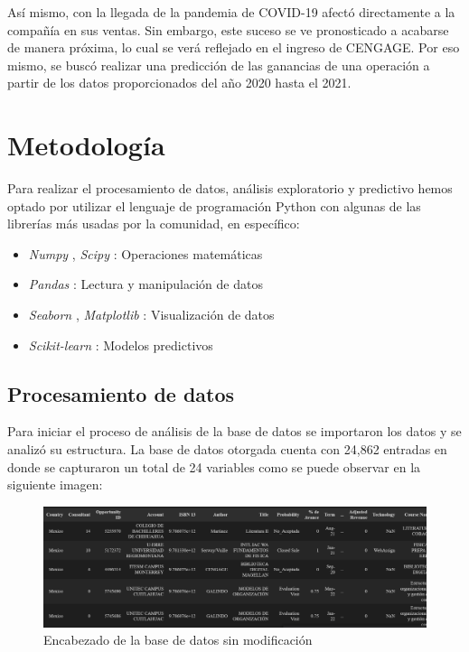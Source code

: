\documentclass{article}
\begin{document}
        Así mismo, con la llegada de la pandemia de COVID-19 afectó directamente a la compañía en sus ventas. Sin embargo, este suceso se ve pronosticado a acabarse de manera próxima, lo cual se verá reflejado en el ingreso de CENGAGE. Por eso mismo, se buscó realizar una predicción de las ganancias de una operación a partir de los datos proporcionados del año 2020 hasta el 2021.

    \section{Metodología}

        Para realizar el procesamiento de datos, análisis exploratorio y predictivo hemos optado por utilizar el lenguaje de programación Python con algunas de las librerías más usadas por la comunidad, en específico:

        \begin{itemize}
            \item \emph{Numpy} \parencite{numpy}, \emph{Scipy} \parencite{2020SciPy-NMeth}: Operaciones matemáticas
            \item \emph{Pandas} \parencite{reback2020pandas}: Lectura y manipulación de datos
            \item \emph{Seaborn} \parencite{seaborn}, \emph{Matplotlib} \parencite{matplotlib}: Visualización de datos
            \item \emph{Scikit-learn} \parencite{scikit-learn}: Modelos predictivos
        \end{itemize}

        \subsection{Procesamiento de datos}

        Para iniciar el proceso de análisis de la base de datos se importaron los datos y se analizó su estructura. La base de datos otorgada cuenta con 24,862 entradas en donde se capturaron un total de 24 variables como se puede observar en la siguiente imagen:

        \begin{figure}[h]
            \centering
            \includegraphics[width=\columnwidth]{tablaSinLimpieza.png}
            \caption{Encabezado de la base de datos sin modificación}
            \label{fig:table}
        \end{figure}
\end{document}

